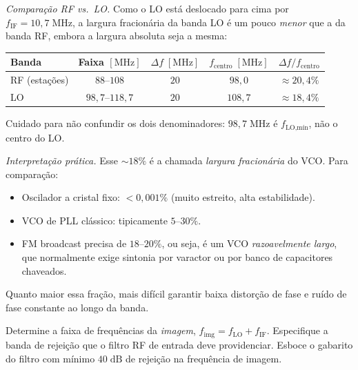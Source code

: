 \documentclass[11pt,a4paper]{article}
\begin{document}
\begin{resolucao}
\emph{Comparação RF vs.\ LO.} Como o LO está deslocado para cima por $f_{\text{IF}} = 10{,}7\;\text{MHz}$, a largura fracionária da banda LO é um pouco \emph{menor} que a da banda RF, embora a largura absoluta seja a mesma:
\begin{center}\small
\begin{tabular}{lcccc}
\toprule
Banda & Faixa $[\text{MHz}]$ & $\Delta f\;[\text{MHz}]$ & $f_{\text{centro}}\;[\text{MHz}]$ & $\Delta f / f_{\text{centro}}$ \\
\midrule
RF (estações) & $88$--$108$    & $20$ & $98{,}0$  & $\approx 20{,}4\%$ \\
LO            & $98{,}7$--$118{,}7$ & $20$ & $108{,}7$ & $\approx 18{,}4\%$ \\
\bottomrule
\end{tabular}
\end{center}
Cuidado para não confundir os dois denominadores: $98{,}7\;\text{MHz}$ é $f_{\text{LO,mín}}$, não o centro do LO.

\emph{Interpretação prática.} Esse $\sim 18\%$ é a chamada \emph{largura fracionária} do VCO. Para comparação:
\begin{itemize}\itemsep0pt
  \item Oscilador a cristal fixo: $< 0{,}001\%$ (muito estreito, alta estabilidade).
  \item VCO de PLL clássico: tipicamente $5$--$30\%$.
  \item FM broadcast precisa de $18$--$20\%$, ou seja, é um VCO \emph{razoavelmente largo}, que normalmente exige sintonia por varactor ou por banco de capacitores chaveados.
\end{itemize}
Quanto maior essa fração, mais difícil garantir baixa distorção de fase e ruído de fase constante ao longo da banda.
\end{resolucao}

\begin{enunciado}[Item b)]
Determine a faixa de frequências da \emph{imagem}, $f_{\text{img}} = f_{\text{LO}} + f_{\text{IF}}$. Especifique a banda de rejeição que o filtro RF de entrada deve providenciar. Esboce o gabarito do filtro com mínimo $40\;\text{dB}$ de rejeição na frequência de imagem.
\end{enunciado}
\end{document}
